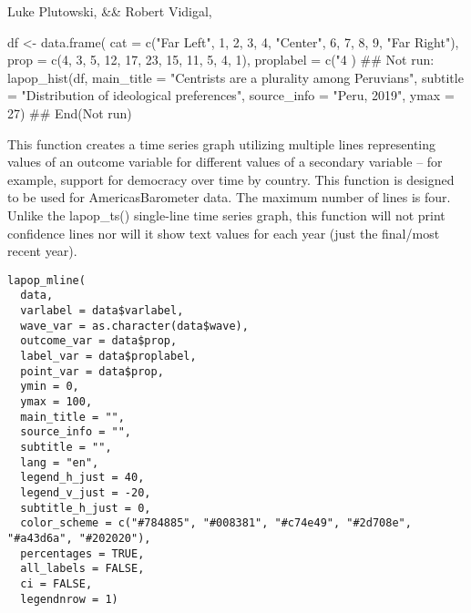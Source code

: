 \documentclass[a4paper]{book}
\begin{document}
%
\begin{Author}
Luke Plutowski,  \&\& Robert Vidigal, 
\end{Author}
%
\begin{Examples}
\begin{ExampleCode}
df <- data.frame(
cat = c("Far Left", 1, 2, 3, 4, "Center", 6, 7, 8, 9, "Far Right"),
prop = c(4, 3, 5, 12, 17, 23, 15, 11, 5, 4, 1),
proplabel = c("4%
)
## Not run: 
lapop_hist(df,
          main_title = "Centrists are a plurality among Peruvians",
          subtitle = "Distribution of ideological preferences",
          source_info = "Peru, 2019",
          ymax = 27)
## End(Not run)
\end{ExampleCode}
\end{Examples}
%
\begin{Description}
This function creates a time series graph utilizing multiple lines representing values of
an outcome variable for different values of a secondary variable -- for example, support for
democracy over time by country.  This function is designed to be used for
AmericasBarometer data.  The maximum number of lines is four.  Unlike the lapop\_ts()
single-line time series graph, this function will not print confidence lines nor will
it show text values for each year (just the final/most recent year).
\end{Description}
%
\begin{Usage}
\begin{verbatim}
lapop_mline(
  data,
  varlabel = data$varlabel,
  wave_var = as.character(data$wave),
  outcome_var = data$prop,
  label_var = data$proplabel,
  point_var = data$prop,
  ymin = 0,
  ymax = 100,
  main_title = "",
  source_info = "",
  subtitle = "",
  lang = "en",
  legend_h_just = 40,
  legend_v_just = -20,
  subtitle_h_just = 0,
  color_scheme = c("#784885", "#008381", "#c74e49", "#2d708e", "#a43d6a", "#202020"),
  percentages = TRUE,
  all_labels = FALSE,
  ci = FALSE,
  legendnrow = 1)
\end{verbatim}
\end{Usage}
%
\end{document}

